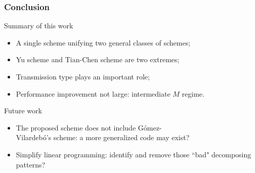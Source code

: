 \documentclass{beamer}
\begin{document}
\begin{frame}
\frametitle{Conclusion}
Summary of this work
\begin{itemize}
\item A single scheme unifying two general classes of schemes;
\item Yu scheme and Tian-Chen scheme are two extremes;
\item Transmission type plays an important role;
\item Performance improvement not large: intermediate $M$ regime.%
\end{itemize}

\vspace{0.5cm}
Future work
\begin{itemize}
\item The proposed scheme does not include G{\'o}mez-\\ Vilardeb{\'o}\footnotemark[1]'s scheme: a more generalized code may exist?
\item Simplify linear programming: identify and remove those ``bad" decomposing patterns?
\end{itemize}
\end{frame}
\end{document}
